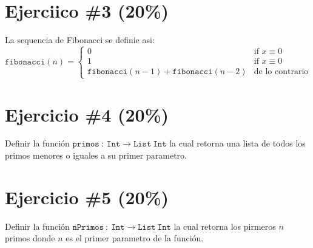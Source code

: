 \documentclass{article}
\begin{document}
\section*{Ejerciico \#3 (20\%)}
La sequencia de Fibonacci se definie asi:
\[
        \mathtt{fibonacci}(n) =
        \left\{
                \begin{array}{ll}
                        0  & \mbox{if } x \equiv 0 \\
                        1 & \mbox{if } x \equiv 0 \\
                        \mathtt{fibonacci}(n-1)+\mathtt{fibonacci}(n-2) & \mbox{de lo contrario}

                \end{array}
        \right.\]

\section*{Ejercicio \#4 (20\%)}
Definir la funci\'on $\mathtt{primos}\ :\ \mathtt{Int}\rightarrow \mathtt{List\ Int}$
la cual retorna una lista de todos los primos menores o iguales a su primer
parametro.

\section*{Ejercicio \#5 (20\%)}
Definir la funci\'on $\mathtt{nPrimos}\ :\ \mathtt{Int}\rightarrow \mathtt{List\ Int}$
la cual retorna los pirmeros $n$ primos donde $n$ es el primer parametro de la funci\'on.

% 
% 
\end{document}
